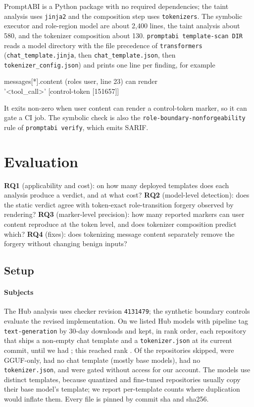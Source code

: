 \documentclass[10pt,conference]{IEEEtran}
\newcommand{\tool}{PromptABI\xspace}
\begin{document}
\tool is a Python package with no required dependencies; the taint analysis
uses \texttt{jinja2} and the composition step uses \texttt{tokenizers}. The
symbolic executor and role-region model are about 2,400 lines, the taint
analysis about 580, and the tokenizer composition about 130.
\texttt{promptabi template-scan DIR} reads a model directory with the file
precedence of \texttt{transformers} (\texttt{chat\_template.jinja}, then
\texttt{chat\_template.json}, then \texttt{tokenizer\_config.json}) and prints
one line per finding, for example
\begin{center}\small\ttfamily
messages[*].content (roles user, line 23) can render\\
'<tool\_call>' [control-token [151657]]
\end{center}
It exits non-zero when user content can render a control-token marker, so it
can gate a CI job. The symbolic check is also the
\texttt{role-boundary-nonforgeability} rule of \texttt{promptabi verify}, which
emits SARIF.

\section{Evaluation}
\label{sec:eval}

\textbf{RQ1} (applicability and cost): on how many deployed templates does each
analysis produce a verdict, and at what cost?
\textbf{RQ2} (model-level detection): does the static verdict agree with
token-exact role-transition forgery observed by rendering?
\textbf{RQ3} (marker-level precision): how many reported markers can user
content reproduce at the token level, and does tokenizer composition predict
which?
\textbf{RQ4} (fixes): does tokenizing message content separately remove the
forgery without changing benign inputs?

\subsection{Setup}

\paragraph{Subjects} The Hub analysis uses checker revision \texttt{4131479};
the synthetic boundary controls evaluate the revised implementation.
On \SnapshotDate{} we listed Hub models with pipeline tag
\texttt{text-generation} by 30-day downloads and kept, in rank order, each
repository that ships a non-empty chat template and a \texttt{tokenizer.json}
at its current commit, until we had \NModels{}; this reached rank
\LastRank{}. Of the \SkipTotal{} repositories skipped, \SkipGGUF{} were
GGUF-only, \SkipNoTemplate{} had no chat template (mostly base models),
\SkipNoTokenizer{} had no \texttt{tokenizer.json}, and \SkipGated{} were gated
without access for our account. The \NModels{} models use \NTemplates{}
distinct templates, because quantized and fine-tuned repositories usually copy
their base model's template; we report per-template counts where duplication
would inflate them. Every file is pinned by commit sha and sha256.
\end{document}

